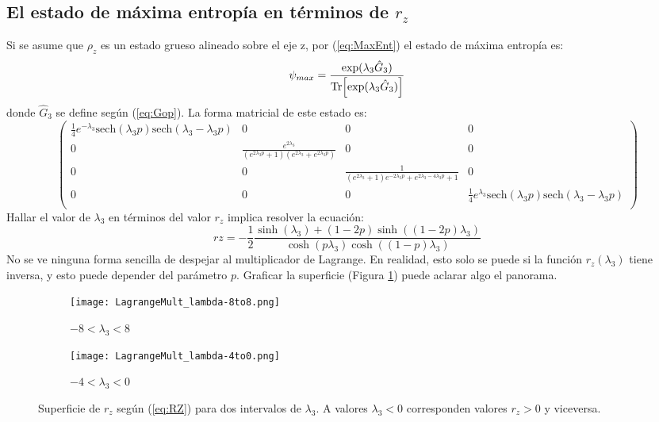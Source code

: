 \documentclass[onecolumn,11pt]{article}
\begin{document}
\subsection{El estado de máxima entropía en términos de $r_{z}$}
Si se asume que $\rho_{z}$ es un estado grueso alineado sobre el eje z, por (\ref{eq:MaxEnt}) el estado de máxima entropía es:
\begin{equation}\label{eq:MaxEntZ}
\psi_{max}=\frac{\text{exp}(\lambda_{3}\hat{G}_{3})}{\Tr[\text{exp}(\lambda_{3}\hat{G}_{3})]}
\end{equation}
donde $\hat{G}_{3}$ se define según (\ref{eq:Gop}). La forma matricial de este estado es:
\begin{equation*}
\left(
\begin{array}{cccc}
 \frac{1}{4} e^{-\lambda_{3}} \text{sech}(\lambda_{3} p)
   \text{sech}(\lambda_{3}-\lambda_{3} p) & 0 & 0 & 0 \\
 0 & \frac{e^{2 \lambda_{3}}}{\left(e^{2 \lambda_{3}
   p}+1\right) \left(e^{2 \lambda_{3}}+e^{2 \lambda_{3}
   p}\right)} & 0 & 0 \\
 0 & 0 & \frac{1}{\left(e^{2 \lambda_{3}}+1\right) e^{-2
   \lambda_{3} p}+e^{2 \lambda_{3}-4 \lambda_{3}
   p}+1} & 0 \\
 0 & 0 & 0 & \frac{1}{4} e^{\lambda_{3}}
   \text{sech}(\lambda_{3} p) \text{sech}(\lambda_{3}-\lambda_{3} p) \\
\end{array}
\right)
\end{equation*}
Hallar el valor de $\lambda_{
3}$ en términos del valor $r_{z}$ implica resolver la ecuación:
\begin{equation}\label{eq:RZ}
rz=-\frac{1}{2}\frac{\sinh(\lambda_{3})+(1-2p)\sinh((1-2p)\lambda_{3})}{\cosh(p\lambda_{3})\cosh((1-p)\lambda_{3})}
\end{equation}
No se ve ninguna forma sencilla de despejar al multiplicador de Lagrange. En realidad, esto solo se puede si la función $r_{z}(\lambda_{3})$ tiene inversa, y esto puede depender del parámetro $p$. Graficar la superficie (Figura \ref{fig:rzsurf}) puede aclarar algo el panorama.
\begin{figure}[h!]
\centering
\begin{subfigure}{0.475\textwidth}
  \centering
  \texttt{[image: LagrangeMult\_lambda-8to8.png]}
  \caption{$-8<\lambda_{3}<8$}
\end{subfigure}%
\begin{subfigure}{0.475\textwidth}
  \centering
  \texttt{[image: LagrangeMult\_lambda-4to0.png]}
  \caption{$-4<\lambda_{3}<0$}
\end{subfigure}
\caption{Superficie de $r_{z}$ según (\ref{eq:RZ}) para dos intervalos de $\lambda_{3}$. A valores $\lambda_{3}<0$ corresponden valores $r_{z}>0$ y viceversa.}
\label{fig:rzsurf}
\end{figure}
\end{document}
